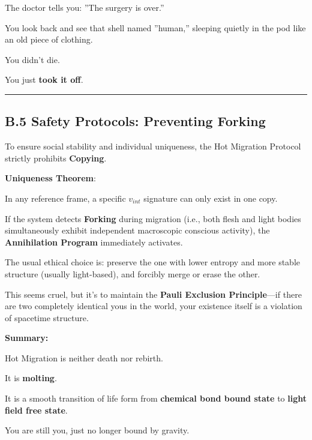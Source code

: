 The doctor tells you: ''The surgery is over.''

You look back and see that shell named ''human,'' sleeping quietly in the pod like an old piece of clothing.

You didn't die.

You just \textbf{took it off}.

\hrule

\subsection{B.5 Safety Protocols: Preventing Forking}

To ensure social stability and individual uniqueness, the Hot Migration Protocol strictly prohibits \textbf{Copying}.

\textbf{Uniqueness Theorem}:

In any reference frame, a specific $v_{int}$ signature can only exist in one copy.

If the system detects \textbf{Forking} during migration (i.e., both flesh and light bodies simultaneously exhibit independent macroscopic conscious activity), the \textbf{Annihilation Program} immediately activates.

The usual ethical choice is: preserve the one with lower entropy and more stable structure (usually light-based), and forcibly merge or erase the other.

This seems cruel, but it's to maintain the \textbf{Pauli Exclusion Principle}---if there are two completely identical yous in the world, your existence itself is a violation of spacetime structure.

\textbf{Summary:}

Hot Migration is neither death nor rebirth.

It is \textbf{molting}.

It is a smooth transition of life form from \textbf{chemical bond bound state} to \textbf{light field free state}.

You are still you, just no longer bound by gravity.

